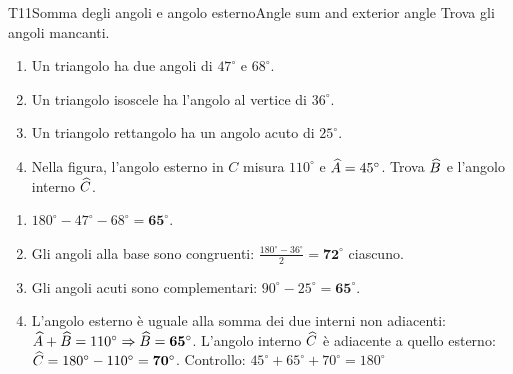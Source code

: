 \begin{esercizio}{T1}{1}{Somma degli angoli e angolo esterno}{Angle sum and exterior angle}
Trova gli angoli mancanti. 
\begin{enumerate}
\item Un triangolo ha due angoli di $47^\circ$ e $68^\circ$. 
\item Un triangolo isoscele ha l'angolo al vertice di $36^\circ$. 
\item Un triangolo rettangolo ha un angolo acuto di $25^\circ$. 
\item Nella figura, l'angolo esterno in $C$ misura $110^\circ$ e $\widehat{A}=45^\circ$. Trova $\widehat{B}$ e l'angolo interno $\widehat{C}$.
\end{enumerate}
\begin{center}
\end{center}
\end{esercizio}
\begin{solbox}
\begin{enumerate}
\item $180^\circ-47^\circ-68^\circ=\mathbf{65^\circ}$.
\item Gli angoli alla base sono congruenti: $\frac{180^\circ-36^\circ}{2}=\mathbf{72^\circ}$ ciascuno.
\item Gli angoli acuti sono complementari: $90^\circ-25^\circ=\mathbf{65^\circ}$.
\item L'angolo esterno è uguale alla somma dei due interni non adiacenti: $\widehat{A}+\widehat{B}=110^\circ\Rightarrow\widehat{B}=\mathbf{65^\circ}$. L'angolo interno $\widehat{C}$ è adiacente a quello esterno: $\widehat{C}=180^\circ-110^\circ=\mathbf{70^\circ}$. Controllo: $45^\circ+65^\circ+70^\circ=180^\circ$ \checkmark
{}
\end{enumerate}
\end{solbox}

